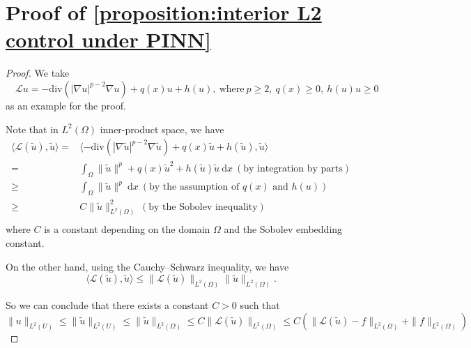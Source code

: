 \documentclass{article}
\renewcommand{\d}{\mathrm{d}}
\begin{document}
\section{Proof of \texorpdfstring{\cref{proposition:interior L2 control under PINN}}{Proposition \ref{proposition:interior L2 control under PINN}}}\label{sec:proof interior L2 control under PINN}
\begin{proof}
    We take 
    \begin{equation}
        \quad \mathcal{L}u = -\mathrm{div} (|\nabla u|^{p-2}\nabla u) + q(x)u+h(u), \ \text{where}\ p\ge 2,\ q(x)\ge 0 ,\ h(u)u\ge 0 
    \end{equation}
    as an example for the proof.

  Note that in $L^{2}(\Omega)$ inner-product space, we have
  \begin{equation*}
  \begin{aligned}
  \langle \mathcal{L}(\tilde{u}),\tilde{u}  \rangle = &\langle -\mathrm{div} (|\nabla \tilde{u}|^{p-2}\nabla \tilde{u}) + q(x)\tilde{u} +h(\tilde{u}) ,\tilde{u}  \rangle \\
=& \int_{\Omega} \|\tilde{u}\|^{p}+  q(x)\tilde{u}^2+ h(\tilde{u})\tilde{u}~\d x \ (\text{by integration by parts})\\
\ge & \int_{\Omega} \|\tilde{u}\|^{p} ~\d x \ (\text{by the assumption of } q(x) \text{ and } h(u))\\
\ge &  C\|\tilde{u}\|_{L^{2}(\Omega)}^{2} \ (\text{by the Sobolev inequality})\\
  \end{aligned}
  \end{equation*}
    where \(C\) is a constant depending on the domain \(\Omega\) and the Sobolev embedding constant.

On the other hand, using the Cauchy--Schwarz inequality, we have
\begin{equation*}
    \langle \mathcal{L}(\tilde{u}),\tilde{u}  \rangle \le \|\mathcal{L}(\tilde{u})\|_{L^{2}(\Omega)}\|\tilde{u}\|_{L^{2}(\Omega)} .
\end{equation*}

So we can conclude that there exists a constant \(C>0\) such that
\begin{equation*}
   \|u\|_{L^{2}(U)}\le \|\tilde{u}\|_{L^{2}(U)}\le \|\tilde{u}\|_{L^{2}(\Omega)} \le C \|\mathcal{L}(\tilde{u})\|_{L^{2}(\Omega)} \le C( \|\mathcal{L}(\tilde{u})-f\|_{L^{2}(\Omega)}+ \|f\|_{L^{2}(\Omega)})
\end{equation*}
\end{proof}
\end{document}
